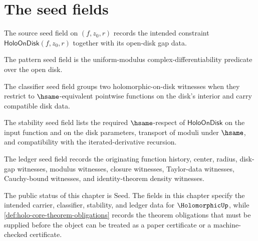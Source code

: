 \section{The seed fields}

\begin{definition}
\label{def:holo-source-spec}
The source seed field on $(f, z_0, r)$ records the intended constraint $\mathsf{HoloOnDisk}(f, z_0, r)$ together with its open-disk gap data.
\end{definition}

\begin{definition}
\label{def:holo-pattern-spec}
The pattern seed field is the uniform-modulus complex-differentiability predicate over the open disk.
\end{definition}

\begin{definition}
\label{def:holo-classifier-spec}
The classifier seed field groups two holomorphic-on-disk witnesses when they restrict to $\hsame$-equivalent pointwise functions on the disk's interior and carry compatible disk data.
\end{definition}

\begin{definition}
\label{def:holo-stability-cert}
The stability seed field lists the required $\hsame$-respect of $\mathsf{HoloOnDisk}$ on the input function and on the disk parameters, transport of moduli under $\hsame$, and compatibility with the iterated-derivative recursion.
\end{definition}

\begin{definition}
\label{def:holo-ledger-policy}
The ledger seed field records the originating function history, center, radius, disk-gap witnesses, modulus witnesses, closure witnesses, Taylor-data witnesses, Cauchy-bound witnesses, and identity-theorem density witnesses.
\end{definition}

\begin{definition}
\label{def:holo-certificate-seed}
The public status of this chapter is $\text{Seed}$. The fields in this chapter specify the intended carrier, classifier, stability, and ledger data for $\HolomorphicUp$, while \autoref{def:holo-core-theorem-obligations} records the theorem obligations that must be supplied before the object can be treated as a paper certificate or a machine-checked certificate.
\end{definition}

